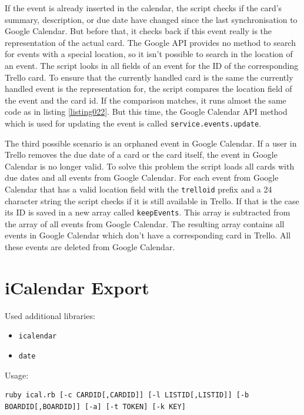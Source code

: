 If the event is already inserted in the calendar, the script checks if the card's summary, description, or due date have changed since the last synchronisation to Google Calendar. But before that, it checks back if this event really is the representation of the actual card. The Google API provides no method to search for events with a special location, so it isn't possible to search in the location of an event. The script looks in all fields of an event for the ID of the corresponding Trello card. To ensure that the currently handled card is the same the currently handled event is the representation for, the script compares the location field of the event and the card id. If the comparison matches, it runs almost the same code as in listing \ref{listing022}. But this time, the Google Calendar API method which is used for updating the event is called \lstinline{service.events.update}. 

The third possible scenario is an orphaned event in Google Calendar. If a user in Trello removes the due date of a card or the card itself, the event in Google Calendar is no longer valid. To solve this problem the script loads all cards with due dates and all events from Google Calendar. For each event from Google Calendar that has a valid location field with the \texttt{trelloid} prefix and a 24 character string the script checks if it is still available in Trello. If that is the case its ID is saved in a new array called \texttt{keepEvents}. This array is subtracted from the array of all events from Google Calendar. The resulting array contains all events in Google Calendar which don't have a corresponding card in Trello. All these events are deleted from Google Calendar.

\section{iCalendar Export}

Used additional libraries:
\begin{itemize}
	\item \texttt{icalendar}
	\item \texttt{date}
\end{itemize}

Usage:
\begin{lstlisting}[aboveskip=1\baselineskip, style=bash, caption=\texttt{ical.rb} usage., label=listing023]
ruby ical.rb [-c CARDID[,CARDID]] [-l LISTID[,LISTID]] [-b BOARDID[,BOARDID]] [-a] [-t TOKEN] [-k KEY]
\end{lstlisting}

